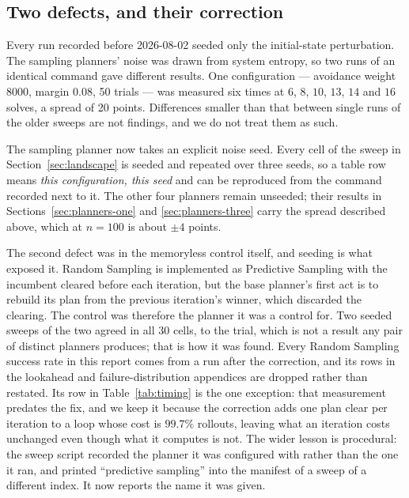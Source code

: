 \documentclass[conference]{IEEEtran}
\begin{document}
\subsection{Two defects, and their correction}
\label{sec:repro}
\label{sec:rng}

Every run recorded before 2026-08-02 seeded only the initial-state perturbation.
The sampling planners' noise was drawn from system entropy, so two runs of an
identical command gave different results. One configuration --- avoidance weight
$8000$, margin $0.08$, 50 trials --- was measured six times at
$6$, $8$, $10$, $13$, $14$ and $16$ solves, a spread of 20 points. Differences
smaller than that between single runs of the older sweeps are not findings, and
we do not treat them as such.

The sampling planner now takes an explicit noise seed. Every cell of the sweep
in Section~\ref{sec:landscape} is seeded and repeated over three seeds, so a
table row means \emph{this configuration, this seed} and can be reproduced from
the command recorded next to it. The other four planners remain unseeded; their
results in Sections~\ref{sec:planners-one} and \ref{sec:planners-three} carry the
spread described above, which at $n = 100$ is about $\pm 4$ points.

The second defect was in the memoryless control itself, and seeding is what
exposed it. Random Sampling is implemented as Predictive Sampling with the
incumbent cleared before each iteration, but the base planner's first act is to
rebuild its plan from the previous iteration's winner, which discarded the
clearing. The control was therefore the planner it was a control for. Two
seeded sweeps of the two agreed in all 30 cells, to the trial, which is not a
result any pair of distinct planners produces; that is how it was found. Every
Random Sampling success rate in this report comes from a run after the
correction, and its rows in the lookahead and failure-distribution appendices
are dropped rather than restated. Its row in Table~\ref{tab:timing} is the one
exception: that measurement predates the fix, and we keep it because the
correction adds one plan clear per iteration to a loop whose cost is $99.7\%$
rollouts, leaving what an iteration costs unchanged even though what it
computes is not. The wider lesson is procedural: the sweep script recorded the
planner it was configured with rather than the one it ran, and printed
``predictive sampling'' into the manifest of a sweep of a different index. It
now reports the name it was given.
\end{document}

